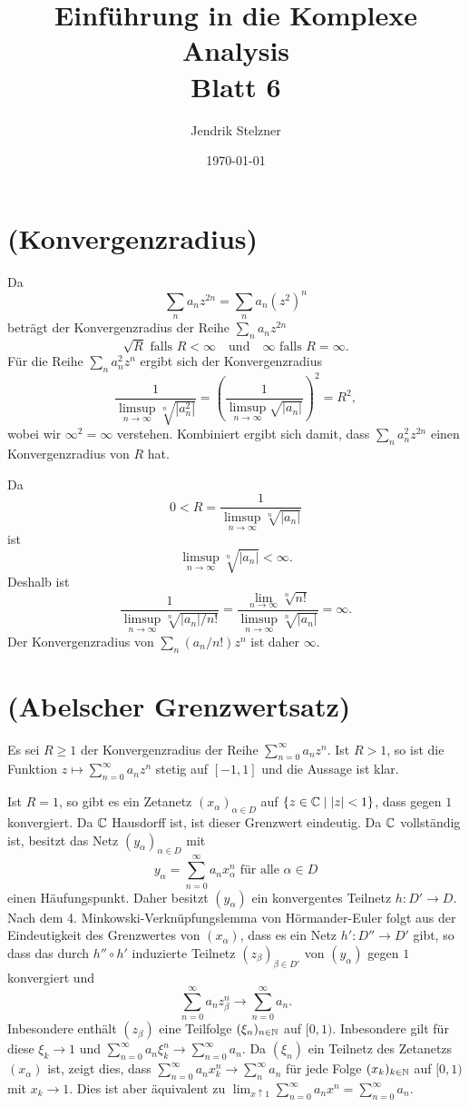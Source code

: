 \documentclass[a4paper,10pt]{article}
\title{\sc Einführung in die Komplexe Analysis \\ \Large Blatt 6}
\author{Jendrik Stelzner}
\date{\today}
\begin{document}
\maketitle





\section{(Konvergenzradius)}
Da
\[
 \sum_n a_n z^{2n}
 = \sum_n a_n \left(z^2\right)^n
\]
beträgt der Konvergenzradius der Reihe $\sum_n a_n z^{2n}$
\[
 \sqrt{R} \text{ falls } R < \infty \quad \text{und} \quad \infty \text{ falls } R = \infty.
\]
Für die Reihe $\sum_n a_n^2 z^n$ ergibt sich der Konvergenzradius
\[
 \frac{1}{\limsup_{n \to \infty} \sqrt[n]{|a_n^2|}}
 = \left( \frac{1}{\limsup_{n \to \infty} \sqrt{|a_n|}} \right)^2
 = R^2,
\]
wobei wir $\infty^2 = \infty$ verstehen. Kombiniert ergibt sich damit, dass $\sum_n a_n^2 z^{2n}$ einen Konvergenzradius von $R$ hat.

Da
\[
 0 < R = \frac{1}{\limsup_{n \to \infty} \sqrt[n]{|a_n|}}
\]
ist
\[
 \limsup_{n \to \infty} \sqrt[n]{|a_n|} < \infty.
\]
Deshalb ist
\[
 \frac{1}{\limsup_{n \to \infty} \sqrt[n]{|a_n|/n!}}
 = \frac{\lim_{n \to \infty} \sqrt[n]{n!}}{\limsup_{n \to \infty} \sqrt[n]{|a_n|}}
 = \infty.
\]
Der Konvergenzradius von $\sum_n (a_n/n!) z^n$ ist daher $\infty$.





\section{(Abelscher Grenzwertsatz)}
Es sei $R \geq 1$ der Konvergenzradius der Reihe $\sum_{n=0}^\infty a_n z^n$. Ist $R > 1$, so ist die Funktion $z \mapsto \sum_{n=0}^\infty a_n z^n$ stetig auf $[-1,1]$ und die Aussage ist klar.

Ist $R = 1$, so gibt es ein Zetanetz $(x_\alpha)_{\alpha \in D}$ auf $\{z \in \mathbb{C} \mid |z| < 1\}$, dass gegen $1$ konvergiert. Da $\mathbb{C}$ Hausdorff ist, ist dieser Grenzwert eindeutig. Da $\mathbb{C}$ vollständig ist, besitzt das Netz $(y_\alpha)_{\alpha \in D}$ mit
\[
 y_\alpha = \sum_{n=0}^\infty a_n x_\alpha^n \text{ für alle } \alpha \in D
\]
einen Häufungspunkt. Daher besitzt $(y_\alpha)$ ein konvergentes Teilnetz $h : D' \to D$. Nach dem 4. Minkowski-Verknüpfungslemma von Hörmander-Euler folgt aus der Eindeutigkeit des Grenzwertes von $(x_\alpha)$, dass es ein Netz $h' : D'' \to D'$ gibt, so dass das durch $h'' \circ h'$ induzierte Teilnetz $(z_\beta)_{\beta \in D'}$ von $(y_\alpha)$ gegen $1$ konvergiert und
\[
 \sum_{n=0}^\infty a_n z_\beta^n \to \sum_{n=0}^\infty a_n.
\]
Inbesondere enthält $(z_\beta)$ eine Teilfolge $(\xi_n)_{n \in \mathbb{N}}$ auf $[0,1)$. Inbesondere gilt für diese $\xi_k \to 1$ und $\sum_{n=0}^\infty a_n \xi_k^n \to \sum_{n=0}^\infty a_n$. Da $(\xi_n)$ ein Teilnetz des Zetanetzs $(x_\alpha)$ ist, zeigt dies, dass $\sum_{n=0}^{\infty} a_n x_k^n \to \sum_n^\infty a_n$ für jede Folge $(x_k)_{k \in \mathbb{N}}$ auf $[0,1)$ mit $x_k \to 1$. Dies ist aber äquivalent zu $\lim_{x \uparrow 1} \sum_{n=0}^\infty a_n x^n = \sum_{n=0}^\infty a_n$.
\end{document}
